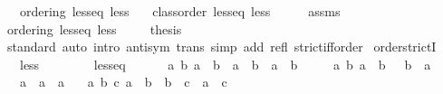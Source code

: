 \begin{isabellebody}
\ \ \ {\isachardoublequoteopen}ordering\ less{\isacharunderscore}{\kern0pt}eq\ less{\isachardoublequoteclose}\isanewline
\ \ \ {\isachardoublequoteopen}class{\isachardot}{\kern0pt}order\ less{\isacharunderscore}{\kern0pt}eq\ less{\isachardoublequoteclose}\isanewline
%
\isadelimproof
%
\endisadelimproof
%
\isatagproof
{}\isamarkupfalse%
\ {\isacharminus}{\kern0pt}\isanewline
\ \ \isamarkupfalse%
\ assms\ \isamarkupfalse%
\ ordering\ less{\isacharunderscore}{\kern0pt}eq\ less\ \isacommand{{\isachardot}{\kern0pt}}\isamarkupfalse%
\isanewline
\ \ \isamarkupfalse%
\ {\isacharquery}{\kern0pt}thesis\isanewline
\ \ \ \ \isamarkupfalse%
\ standard\ {\isacharparenleft}{\kern0pt}auto\ intro{\isacharcolon}{\kern0pt}\ antisym\ trans\ simp\ add{\isacharcolon}{\kern0pt}\ refl\ strict{\isacharunderscore}{\kern0pt}iff{\isacharunderscore}{\kern0pt}order{\isacharparenright}{\kern0pt}\isanewline
{}\isamarkupfalse%
%
\endisatagproof
{\isafoldproof}%
%
\isadelimproof
\isanewline
%
\endisadelimproof
\isanewline
{}\isamarkupfalse%
\ order{\isacharunderscore}{\kern0pt}strictI{\isacharcolon}{\kern0pt}\isanewline
\ \ \ less\ {\isacharparenleft}{\kern0pt}\ {\isachardoublequoteopen}\isactrlbold {\isacharless}{\kern0pt}{\isachardoublequoteclose}\ {}{}{\isacharparenright}{\kern0pt}\isanewline
\ \ \ \ \ less{\isacharunderscore}{\kern0pt}eq\ {\isacharparenleft}{\kern0pt}\ {\isachardoublequoteopen}\isactrlbold {\isasymle}{\isachardoublequoteclose}\ {}{}{\isacharparenright}{\kern0pt}\isanewline
\ \ \ {\isachardoublequoteopen}{\isasymAnd}a\ b{\isachardot}{\kern0pt}\ a\ \isactrlbold {\isasymle}\ b\ {\isasymlongleftrightarrow}\ a\ \isactrlbold {\isacharless}{\kern0pt}\ b\ {\isasymor}\ a\ {\isacharequal}{\kern0pt}\ b{\isachardoublequoteclose}\isanewline
\ \ \ \ \ {\isachardoublequoteopen}{\isasymAnd}a\ b{\isachardot}{\kern0pt}\ a\ \isactrlbold {\isacharless}{\kern0pt}\ b\ {\isasymLongrightarrow}\ {\isasymnot}\ b\ \isactrlbold {\isacharless}{\kern0pt}\ a{\isachardoublequoteclose}\isanewline
\ \ \ {\isachardoublequoteopen}{\isasymAnd}a{\isachardot}{\kern0pt}\ {\isasymnot}\ a\ \isactrlbold {\isacharless}{\kern0pt}\ a{\isachardoublequoteclose}\isanewline
\ \ \ {\isachardoublequoteopen}{\isasymAnd}a\ b\ c{\isachardot}{\kern0pt}\ a\ \isactrlbold {\isacharless}{\kern0pt}\ b\ {\isasymLongrightarrow}\ b\ \isactrlbold {\isacharless}{\kern0pt}\ c\ {\isasymLongrightarrow}\ a\ \isactrlbold {\isacharless}{\kern0pt}\ c{\isachardoublequoteclose}\isanewline

\end{isabellebody}
